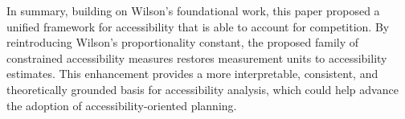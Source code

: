 \documentclass[
  10pt,
  letterpaper,
]{article}
\begin{document}
In summary, building on Wilson's \citep{wilson1971} foundational work,
this paper proposed a unified framework for accessibility that is able
to account for competition. By reintroducing Wilson's proportionality
constant, the proposed family of constrained accessibility measures
restores measurement units to accessibility estimates. This enhancement
provides a more interpretable, consistent, and theoretically grounded
basis for accessibility analysis, which could help advance the adoption
of accessibility-oriented planning.


\nolinenumbers
  
\end{document}
